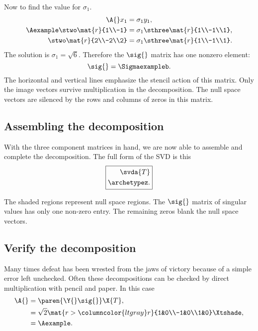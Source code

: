 Now to find the value for $\sigma_{1}$.
\begin{equation}
  \begin{split}
    \A{}x_{1} &= \sigma_{1} y_{1},\\
    \Aexample \stwo\mat{r}{1\\-1} &= \sigma_{1}\sthree\mat{r}{1\\-1\\1},\\
    \stwo\mat{r}{2\\-2\\2} &= \sigma_{1}\sthree\mat{r}{1\\-1\\1}.
  \end{split}
\end{equation}
The solution is $\sigma_{1}=\sqrt{6}$. Therefore the $\sig{}$ matrix has one nonzero element:
\begin{equation}
  \sig{} = \Sigmaexampleb.
\end{equation}
The horizontal and vertical lines emphasize the stencil action of this matrix. Only the image vectors survive multiplication in the decomposition. The null space vectors are silenced by the rows and columns of zeros in this matrix.

\subsection{Assembling the decomposition}
With the three component matrices in hand, we are now able to assemble and complete the decomposition. The full form of the SVD is this
\begin{equation}
  \boxed{
\begin{split}
    \svda{T}\\
    \archetypez.
  \label{eq:simple:svd}
\end{split}
  }
\end{equation}

The shaded regions represent null space regions. The $\sig{}$ matrix of singular values has only one non-zero entry. The remaining zeros blank the null space vectors.  

\subsection{Verify the decomposition}
Many times defeat has been wrested from the jaws of victory because of a simple error left unchecked. Often these decompositions can be checked by direct multiplication with pencil and paper. In this case
\begin{equation}
  \begin{split}
    \A{} &= \paren{\Y{}\sig{}}\X{T}, \\
      &= \sqrt{2}\mat{r >{\columncolor{ltgray}}r}{1&0\\-1&0\\1&0}\Xtshade,\\
      &= \Aexample.
  \end{split}
\end{equation}

